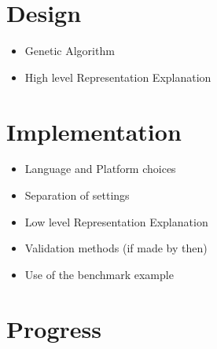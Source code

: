 \documentclass[a4paper]{article}
\begin{document}
\section{Design}
\begin{itemize}
    \item Genetic Algorithm
    \item High level Representation Explanation
\end{itemize}

\section{Implementation}
\begin{itemize}
    \item Language and Platform choices
    \item Separation of settings
    \item Low level Representation Explanation
    \item Validation methods (if made by then)
    \item Use of the benchmark example
\end{itemize}

\section{Progress}
\end{document}
